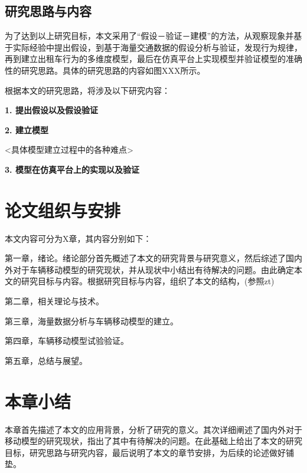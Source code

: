 \subsection{研究思路与内容}

为了达到以上研究目标，本文采用了“假设－验证－建模”的方法，从观察现象并基于实际经验中提出假设，到基于海量交通数据的假设分析与验证，发现行为规律，再到建立出租车行为的多维度模型，最后在仿真平台上实现模型并验证模型的准确性的研究思路。具体的研究思路的内容如图XXX所示。

根据本文的研究思路，将涉及以下研究内容：

\textbf{1. 提出假设以及假设验证}

\textbf{2. 建立模型}

<具体模型建立过程中的各种难点>

\textbf{3. 模型在仿真平台上的实现以及验证}

\section{论文组织与安排}

本文内容可分为X章，其内容分别如下：

第一章，绪论。绪论部分首先概述了本文的研究背景与研究意义，然后综述了国内外对于车辆移动模型的研究现状，并从现状中小结出有待解决的问题。由此确定本文的研究目标与内容。根据研究目标与内容，组织了本文的结构，(参照zt)

第二章，相关理论与技术。

第三章，海量数据分析与车辆移动模型的建立。

第四章，车辆移动模型试验验证。

第五章，总结与展望。

\section{本章小结}

本章首先描述了本文的应用背景，分析了研究的意义。其次详细阐述了国内外对于移动模型的研究现状，指出了其中有待解决的问题。在此基础上给出了本文的研究目标，研究思路与研究内容，最后说明了本文的章节安排，为后续的论述做好铺垫。